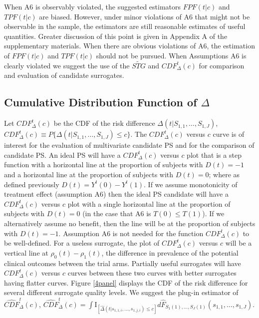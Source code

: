 \documentclass[times, doublespace]{simauth}
\begin{document}
When A6 is observably violated, the suggested estimators $FPF(t|c)$ and $TPF(t|c)$ are biased. However, under minor violations of A6 that might not be observable in the sample, the estimators are still reasonable estimates of useful quantities. Greater discussion of this point is given in Appendix A of the supplementary materials. When there are obvious violations of A6, the estimation of $FPF(t|c)$ and $TPF(t|c)$ should not be pursued. When Assumptions A6 is clearly violated we suggest the use of the $\widetilde{STG}$ and $CDF^{t}_{\Delta}(c)$ for comparison and evaluation of candidate surrogates.

\subsection{Cumulative Distribution Function of $\Delta$} \label{CDF}

 Let $CDF^{t}_{\Delta}(c)$ be the CDF of the risk difference $\Delta(t|S_{1,1}, \dots, S_{1,J})$, $CDF^{t}_{\Delta}(c)\equiv P\{\Delta(t|S_{1,1}, \dots, S_{1,J})\leq c\}.$ The $CDF^{t}_{\Delta}(c)$ versus $c$ curve is of interest for the evaluation of multivariate candidate PS and for the comparison of candidate PS. An ideal PS will have a $CDF^{t}_{\Delta}(c)$ versus $c$ plot that is a step function with a horizontal line at the proportion of subjects with $D(t)=-1$ and a horizontal line at the proportion of subjects with $D(t)=0$; where as defined previously $D(t)=Y^{t}(0)-Y^{t}(1)$. If we assume monotonicity of treatment effect (assumption A6) then the ideal PS candidate will have a $CDF^{t}_{\Delta}(c)$ versus $c$ plot with a single horizontal line at the proportion of subjects with $D(t)=0$ (in the case that A6 is $T(0) \leq T(1)$). If we alternatively assume no benefit, then the line will be at the proportion of subjects with $D(t)=-1$. Assumption A6 is not needed for the function $CDF^{t}_{\Delta}(c)$ to be well-defined. For a useless surrogate, the plot of $CDF^{t}_{\Delta}(c)$ versus $c$ will be a vertical line at $\rho_0(t)-\rho_1(t)$, the difference in prevalence of the potential clinical outcomes between the trial arms. Partially useful surrogates will have $CDF^{t}_{\Delta}(c)$ versus $c$ curves between these two curves with better surrogates having flatter curves. Figure \ref{4panel} displays the CDF of the risk difference for several different surrogate quality levels. We suggest the plug-in estimator of $\widehat{CDF}^{t}_{\Delta}(c)$, $\widehat{CDF}^{t}_{\Delta}(c)=\int{\mathrm{I}_{[\hat{\Delta}(t|s_{1,1,i}, \dots, s_{1,j,i})\leq c]} d\hat{F}_{S_1(1), \ldots, S_J(1)}(s_{1,1}, \dots, s_{1,J})}$. 
\end{document}
